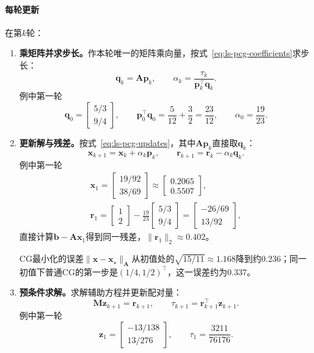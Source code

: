 \paragraph{每轮更新}
在第$k$轮：
\begin{enumerate}
 \item \textbf{乘矩阵并求步长。}作本轮唯一的矩阵乘向量，按式~\eqref{eq:ls-pcg-coefficients}求步长：
 \[
  \bm q_k=\bm A\bm p_k,\qquad \alpha_k=\frac{\tau_k}{\bm p_k^\top\bm q_k}.
 \]
 例中第一轮
 \[
  \bm q_0=\begin{bmatrix}5/3\\9/4\end{bmatrix},\qquad \bm p_0^\top\bm q_0=\frac5{12}+\frac32=\frac{23}{12},\qquad \alpha_0=\frac{19}{23}.
 \]

 \item \textbf{更新解与残差。}按式~\eqref{eq:ls-pcg-updates}，其中$\bm A\bm p_k$直接取$\bm q_k$：
 \[
  \bm x_{k+1}=\bm x_k+\alpha_k\bm p_k,\qquad \bm r_{k+1}=\bm r_k-\alpha_k\bm q_k .
 \]
 例中第一轮
 \[
  \begin{gathered}
  \bm x_1=\begin{bmatrix}19/92\\38/69\end{bmatrix}\approx\begin{bmatrix}0.2065\\0.5507\end{bmatrix},\\
  \bm r_1=\begin{bmatrix}1\\2\end{bmatrix}-\frac{19}{23}\begin{bmatrix}5/3\\9/4\end{bmatrix}=\begin{bmatrix}-26/69\\13/92\end{bmatrix},
  \end{gathered}
 \]
 直接计算$\bm b-\bm A\bm x_1$得到同一残差，$\lVert\bm r_1\rVert_2\approx0.402$。

 CG最小化的误差$\lVert\bm x-\bm x_\star\rVert_{\bm A}$从初值处的$\sqrt{15/11}\approx1.168$降到约$0.236$；同一初值下普通CG的第一步是$(1/4,1/2)^\top$，这一误差约为$0.337$。

 \item \textbf{预条件求解。}求解辅助方程并更新配对量：
 \[
  \bm M\bm z_{k+1}=\bm r_{k+1},\qquad \tau_{k+1}=\bm r_{k+1}^\top\bm z_{k+1}.
 \]
 例中第一轮
 \[
  \bm z_1=\begin{bmatrix}-13/138\\13/276\end{bmatrix},\qquad
  \tau_1=\frac{3211}{76176}.
 \]


\end{enumerate}
